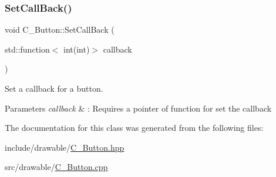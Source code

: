 \subsubsection{\texorpdfstring{Set\+Call\+Back()}{SetCallBack()}}
{\footnotesize\ttfamily void C\+\_\+\+Button\+::\+Set\+Call\+Back (\begin{DoxyParamCaption}\item[{std\+::function$<$ int(int)$>$}]{callback }\end{DoxyParamCaption})}



Set a callback for a button. 


\begin{DoxyParams}{Parameters}
{\em callback} & \+: Requires a pointer of function for set the callback \\
\hline
\end{DoxyParams}


The documentation for this class was generated from the following files\+:\begin{DoxyCompactItemize}
\item 
include/drawable/\hyperlink{C__Button_8hpp}{C\+\_\+\+Button.\+hpp}\item 
src/drawable/\hyperlink{C__Button_8cpp}{C\+\_\+\+Button.\+cpp}\end{DoxyCompactItemize}
